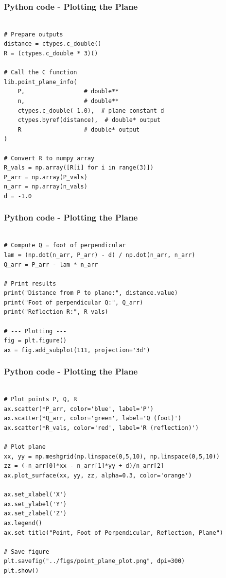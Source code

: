 \documentclass{beamer}
\begin{document}
\begin{frame}[fragile]                            
\frametitle{Python code - Plotting the Plane}                
\begin{lstlisting}

# Prepare outputs
distance = ctypes.c_double()
R = (ctypes.c_double * 3)()

# Call the C function
lib.point_plane_info(
    P,                 # double**
    n,                 # double**
    ctypes.c_double(-1.0),  # plane constant d
    ctypes.byref(distance),  # double* output
    R                  # double* output
)

# Convert R to numpy array
R_vals = np.array([R[i] for i in range(3)])
P_arr = np.array(P_vals)
n_arr = np.array(n_vals)
d = -1.0
\end{lstlisting}
\end{frame}

\begin{frame}[fragile]                            
\frametitle{Python code - Plotting the Plane}                
\begin{lstlisting}

# Compute Q = foot of perpendicular
lam = (np.dot(n_arr, P_arr) - d) / np.dot(n_arr, n_arr)
Q_arr = P_arr - lam * n_arr

# Print results
print("Distance from P to plane:", distance.value)
print("Foot of perpendicular Q:", Q_arr)
print("Reflection R:", R_vals)

# --- Plotting ---
fig = plt.figure()
ax = fig.add_subplot(111, projection='3d')
\end{lstlisting}
\end{frame}

\begin{frame}[fragile]                            
\frametitle{Python code - Plotting the Plane}                
\begin{lstlisting}

# Plot points P, Q, R
ax.scatter(*P_arr, color='blue', label='P')
ax.scatter(*Q_arr, color='green', label='Q (foot)')
ax.scatter(*R_vals, color='red', label='R (reflection)')

# Plot plane
xx, yy = np.meshgrid(np.linspace(0,5,10), np.linspace(0,5,10))
zz = (-n_arr[0]*xx - n_arr[1]*yy + d)/n_arr[2]
ax.plot_surface(xx, yy, zz, alpha=0.3, color='orange')

ax.set_xlabel('X')
ax.set_ylabel('Y')
ax.set_zlabel('Z')
ax.legend()
ax.set_title("Point, Foot of Perpendicular, Reflection, Plane")

# Save figure
plt.savefig("../figs/point_plane_plot.png", dpi=300)
plt.show()
\end{lstlisting}                               
\end{frame}
\end{document}
